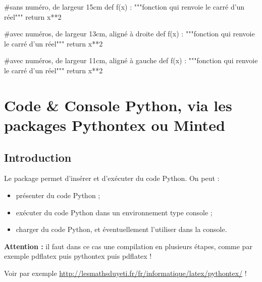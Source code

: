 \documentclass{article}
\newcommand\ctex[1]{\tcbox[vignettelatex]{#1}}
\begin{document}
\begin{codesortie}
\begin{envcodepiton}[Lignes=false,Largeur=15cm]
#sans numéro, de largeur 15cm
def f(x) :
	"""fonction qui renvoie le carré d'un réel"""
	return x**2
\end{envcodepiton}

\begin{envcodepiton}[Alignement=flush right,Largeur=13cm]
#avec numéros, de largeur 13cm, aligné à droite
def f(x) :
	"""fonction qui renvoie le carré d'un réel"""
	return x**2
\end{envcodepiton}

\begin{envcodepiton}[Alignement=flush left,Largeur=11cm]
#avec numéros, de largeur 11cm, aligné à gauche
def f(x) :
	"""fonction qui renvoie le carré d'un réel"""
	return x**2
\end{envcodepiton}
\end{codesortie}

\pagebreak

\section{Code \& Console Python, via les packages Pythontex ou Minted}

\subsection{Introduction}

\begin{codeidee}
Le {package} \ctex{pythontex} permet d'insérer et d'exécuter du code Python. On peut :

\begin{itemize}
	\item présenter du code Python ;
	\item exécuter du code Python dans un environnement type \og console \fg{} ;
	\item charger du code Python, et éventuellement l'utiliser dans la console.
\end{itemize}
\end{codeidee}

\begin{codeattention}
\textbf{Attention : }il faut dans ce cas une compilation en plusieurs étapes, comme par exemple \textsf{pdflatex puis pythontex puis pdflatex} !

Voir par exemple \url{http://lesmathsduyeti.fr/fr/informatique/latex/pythontex/} !
\end{codeattention}
\end{document}
